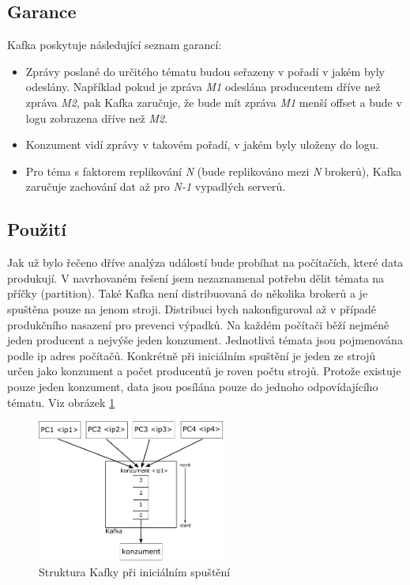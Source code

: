 \documentclass[
  digital, %
  table,   %
  nolof,     %
  nolot,     %
  oneside, %
  nocover,
  monochrome,
  12pt
]{fithesis3}
\begin{document}
\subsection*{Garance}
Kafka poskytuje následující seznam garancí:
\begin{itemize}
  \item Zprávy poslané do určitého tématu budou seřazeny v pořadí v jakém byly odeslány. Například pokud je zpráva \textit{M1} odeslána producentem dříve než zpráva \textit{M2}, pak Kafka zaručuje, že bude mít zpráva \textit{M1} menší offset a bude v logu zobrazena dříve než \textit{M2}.
  \item Konzument vidí zprávy v takovém pořadí, v jakém byly uloženy do logu.
  \item Pro téma s faktorem replikování \textit{N} (bude replikováno mezi \textit{N} brokerů), Kafka zaručuje zachování dat až pro \textit{N-1} vypadlých serverů.
\end{itemize}

\subsection*{Použití}
Jak už bylo řečeno dříve analýza událostí bude probíhat na počítačích, které data produkují. V navrhovaném řešení jsem nezaznamenal potřebu dělit témata na příčky (partition). Také Kafka není distribuovaná do několika brokerů a je spuštěna pouze na jenom stroji. Distribuci bych nakonfiguroval až v případě produkčního nasazení pro prevenci výpadků. Na každém počítači běží nejméně jeden producent a nejvýše jeden konzument. Jednotlivá témata jsou pojmenována podle ip adres počítačů. Konkrétně při iniciálním spuštění je jeden ze strojů určen jako konzument a počet producentů je roven počtu strojů. Protože existuje pouze jeden konzument, data jsou posílána pouze do jednoho odpovídajícího tématu. Viz obrázek \ref{fig:kafka-impl}

\begin{figure}[H]
	\centering
    \includegraphics[width=0.55\textwidth, height=0.3\textheight]{images/kafka-impl.png}
    \caption{Struktura Kafky při iniciálním spuštění}
    \label{fig:kafka-impl}
\end{figure}
\end{document}
